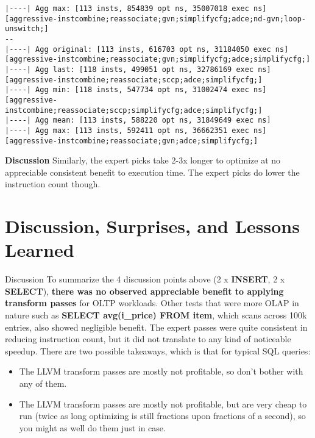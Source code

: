 \documentclass{vldb}
\newcommand{\dbCode}[1]{{\sffamily\small \textbf{#1}}\xspace}
\begin{document}
\begin{lstlisting}
|----| Agg max: [113 insts, 854839 opt ns, 35007018 exec ns] [aggressive-instcombine;reassociate;gvn;simplifycfg;adce;nd-gvn;loop-unswitch;]
--
|----| Agg original: [113 insts, 616703 opt ns, 31184050 exec ns] [aggressive-instcombine;reassociate;gvn;simplifycfg;adce;simplifycfg;]
|----| Agg last: [118 insts, 499051 opt ns, 32786169 exec ns] [aggressive-instcombine;reassociate;sccp;adce;simplifycfg;]
|----| Agg min: [118 insts, 547734 opt ns, 31002474 exec ns] [aggressive-instcombine;reassociate;sccp;simplifycfg;adce;simplifycfg;]
|----| Agg mean: [113 insts, 588220 opt ns, 31849649 exec ns]
|----| Agg max: [113 insts, 592411 opt ns, 36662351 exec ns] [aggressive-instcombine;reassociate;gvn;adce;simplifycfg;]
\end{lstlisting}

\textbf{Discussion} Similarly, the expert picks take 2-3x longer to optimize at no appreciable consistent benefit to execution time. The expert picks do lower the instruction count though.


\section{Discussion, Surprises, and Lessons Learned}

Discussion To summarize the 4 discussion points above (2 x \dbCode{INSERT}, 2 x \dbCode{SELECT}), \textbf{there was no observed appreciable benefit to applying transform passes} for OLTP workloads. Other tests that were more OLAP in nature such as \dbCode{SELECT avg(i\_price) FROM item}, which scans across 100k entries, also showed negligible benefit. The expert passes were quite consistent in reducing instruction count, but it did not translate to any kind of noticeable speedup. There are two possible takeaways, which is that for typical SQL queries:
\begin{itemize}
    \item The LLVM transform passes are mostly not profitable, so don't bother with any of them.
    \item The LLVM transform passes are mostly not profitable, but are very cheap to run (twice as long optimizing is still fractions upon fractions of a second), so you might as well do them just in case.
\end{itemize}
\end{document}
